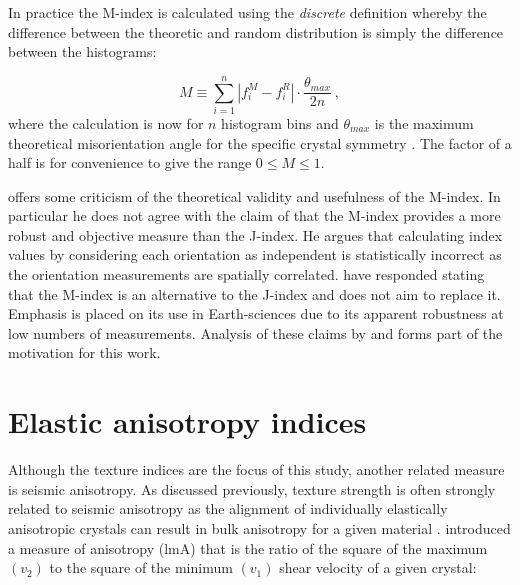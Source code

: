 \documentclass[a4paper,12pt,twoside]{report}
\numberwithin{equation}{chapter}
\begin{document}
In practice the M-index is calculated using the \emph{discrete} definition whereby the difference between the theoretic and random distribution is simply the difference between the histograms:

\begin{equation} \label{eq:Mindex_disc}
M \equiv \sum_{i=1}^n | f_i^M - f_i^R | \cdot \frac{\theta_{max}}{2n}\ ,
\end{equation} 
where the calculation is now for $n$ histogram bins and $\theta_{max}$ is the maximum theoretical misorientation angle for the specific crystal symmetry \citep[for discussion on misorientation angle distirbutions for various crystal symmetries see][and references therein]{Grimmer1979,Wheeler2001}. The factor of a half is for convenience to give the range $0 \leq M \leq 1$. 

  

\cite{Schaeben2007} offers some criticism of the theoretical validity and usefulness of the M-index. In particular he does not agree with the claim of \cite{Skemer} that the M-index provides a more robust and objective measure than the J-index. He argues that calculating index values by considering each orientation as independent is statistically incorrect as the orientation measurements are spatially correlated. \cite{Skemer2007reply} have responded stating that the M-index is an alternative to the J-index and does not aim to replace it. Emphasis is placed on its use in Earth-sciences due to its apparent robustness at low numbers of measurements. Analysis of these claims by \cite{Skemer} and \cite{Skemer2007reply} forms part of the motivation for this work.  

\section{Elastic anisotropy indices} \label{sec:anisotropy_indices}

Although the texture indices are the focus of this study, another related measure is seismic anisotropy. As discussed previously, texture strength is often strongly related to seismic anisotropy as the alignment of individually elastically anisotropic crystals can result in bulk anisotropy for a given material \citep[e.g.][]{Tommasi1999,Miyagi2010}. \cite{Ledbetter2006} introduced a measure of anisotropy (lmA) that is the ratio of the square of the maximum $(v_2)$ to the square of the minimum $(v_1)$ shear velocity of a given crystal:
\end{document}
